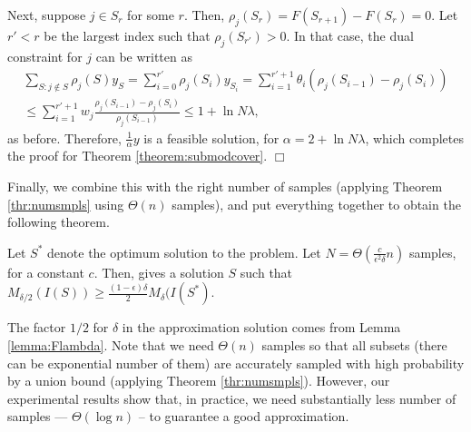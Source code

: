 Next, suppose $j\in S_r$ for some $r$. Then, $\rho_j(S_{r})= F(S_{r+1}) - F(S_r)=0$. Let $r'<r$ be
the largest index such that $\rho_j(S_{r'})>0$. In that case, the dual constraint for $j$ can be
written as
\begin{eqnarray*}
\sum_{S: j\not\in S} \rho_j(S)y_S = \sum_{i=0}^{r'} \rho_j(S_i) y_{S_i}
= \sum_{i=1}^{r'+1} \theta_i(\rho_j(S_{i-1}) - \rho_j(S_i))\\
\leq \sum_{i=1}^{r'+1} w_j \frac{\rho_j(S_{i-1}) - \rho_j(S_i)}{\rho_j(S_{i-1})}
\leq 1+\ln{N\lambda},
\end{eqnarray*}
as before. Therefore, $\frac{1}{\alpha}y$ is a feasible solution, for $\alpha = 2+\ln{N\lambda}$, which  completes the proof for Theorem
\ref{theorem:submodcover}.
$\Box$

Finally, we combine this with the right number of samples (applying Theorem \ref{thr:numsmpls} using $\Theta(n)$ samples), and put everything together to obtain the following theorem.

\begin{theorem}
\label{theorem:mulcritguarantee}
Let $S^*$ denote the optimum solution to the \infprob{} problem.
Let $N=\Theta(\frac{c}{\epsilon^2\delta}n)$ samples, for a constant $c$. Then,  \multicritalgo{} gives a solution $S$ such that $M_{\delta/2}(I(S)) \geq \frac{(1-\epsilon)\delta}{2} M_{\delta}(I(S^*)$.
\end{theorem}
The factor $1/2$ for $\delta$ in the approximation solution comes from Lemma \ref{lemma:Flambda}.
Note that we need $\Theta(n)$ samples so that all subsets (there can be exponential number of them)
are accurately sampled with high probability by a union bound (applying Theorem \ref{thr:numsmpls}).
However,  our experimental results show that, in practice, we need substantially less number of samples  ---
$\Theta(\log n)$ --
to guarantee a good approximation.




